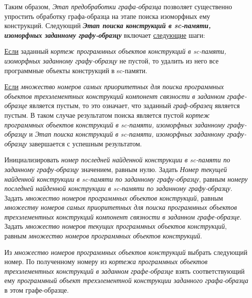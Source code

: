 \begin{SCn}
\begin{scnsubstruct}
\begin{scnsubstruct}
\begin{scnsubstruct}
\begin{scnsubstruct}
\begin{scnsubstruct}
\begin{scnsubstruct}
\begin{scnsubstruct}
\begin{scnsubstruct}
{			Таким образом, \textit{Этап предобработки графа-образца} позволяет существенно упростить обработку графа-образца на этапе поиска изоморфных ему конструкций. Следующий \textbf{\textit{Этап поиска конструкций в sc-памяти, изоморфных заданному графу-образцу}} включает \uline{следующие} шаги:
			\begin{scnitemize}
				\item \uline{Если} заданный \textit{кортеж программных объектов конструкций в sc-памяти, изоморфных заданному графу-образцу} не пустой, то удалить из него все программные объекты конструкций в sc-памяти.
				\item \uline{Если} \textit{множество номеров самых приоритетных для поиска программных объектов трехэлементных конструкций компонент связности в заданном графе-образце} является пустым, то это означает, что заданный \textit{граф-образец} является пустым. В таком случае результатом поиска является пустой \textit{кортеж программных объектов конструкций в sc-памяти, изоморфных заданному графу-образцу} и \textit{Этап поиска конструкций в sc-памяти, изоморфных заданному графу-образцу} завершается с успешным результатом.
				\item Инициализировать \textit{номер последней найденной конструкции в sc-памяти по заданному графу-образцу} значением, равным нулю. Задать \textit{Номер текущей найденной конструкции в sc-памяти по заданному графу-образцу}, равным \textit{номеру последней найденной конструкции в sc-памяти по заданному графу-образцу}. Задать \textit{множество номеров  программных объектов конструкций}, равным \textit{множеству номеров самых приоритетных для поиска программных объектов трехэлементных конструкций компонент связности в заданном графе-образце}. Задать \textit{множество номеров текущих программных объектов конструкций}, равным \textit{множество номеров  программных объектов конструкций}.
				\item Из \textit{множество номеров  программных объектов конструкций} выбрать следующий номер. По полученному номеру из \textit{кортежа программных объектов трехэлементных конструкций в заданном графе-образце} взять соответствующий ему \textit{программный объект трехэлементной конструкции заданного графа-образца} в этом графе-образце.

\end{scnitemize}}
\end{scnsubstruct}
\end{scnsubstruct}
\end{scnsubstruct}
\end{scnsubstruct}
\end{scnsubstruct}
\end{scnsubstruct}
\end{scnsubstruct}
\end{scnsubstruct}
\end{SCn}
